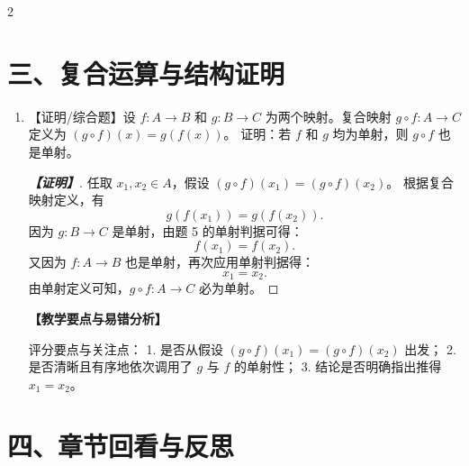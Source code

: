 \documentclass[12pt]{ctexart}
\newenvironment{solution}[1][解]{%
    \par\begingroup\color{blue!85!black}%
    \begin{proof}[\indent\bfseries\color{blue!85!black}【#1】]%
  }{%
    \end{proof}\endgroup\par
  }
\newenvironment{teacherNote}[1][教学要点与易错分析]{%
    \par\vspace{0.6ex}%
    \begingroup\color{teal!80!black}\small
    \noindent\textbf{【#1】}\par\vspace{0.2ex}%
  }{%
    \endgroup\par\vspace{0.6ex}%
  }
\newcommand{\ansspace}[1]{\par\vspace{0.4ex}}
\newcommand{\ansspace}[1]{\vspace{#1}}
\begin{document}
\begin{multicols}{2}
\section*{三、复合运算与结构证明}

\begin{enumerate}[resume=probchain]

\item 【证明/综合题】设 $f: A \to B$ 和 $g: B \to C$ 为两个映射。复合映射 $g \circ f: A \to C$ 定义为 $(g \circ f)(x) = g(f(x))$。
证明：若 $f$ 和 $g$ 均为单射，则 $g \circ f$ 也是单射。
\ansspace{5.5cm}
\begin{solution}[证明]
任取 $x_1, x_2 \in A$，假设 $(g \circ f)(x_1) = (g \circ f)(x_2)$。
根据复合映射定义，有
\[
  g(f(x_1)) = g(f(x_2)).
\]
因为 $g: B \to C$ 是单射，由题 5 的单射判据可得：
\[
  f(x_1) = f(x_2).
\]
又因为 $f: A \to B$ 也是单射，再次应用单射判据得：
\[
  x_1 = x_2.
\]
由单射定义可知，$g \circ f: A \to C$ 必为单射。
\end{solution}
\begin{teacherNote}
评分要点与关注点：
1. 是否从假设 $(g \circ f)(x_1) = (g \circ f)(x_2)$ 出发；
2. 是否清晰且有序地依次调用了 $g$ 与 $f$ 的单射性；
3. 结论是否明确指出推得 $x_1 = x_2$。
\end{teacherNote}

\end{enumerate}

\section*{四、章节回看与反思}

\begin{enumerate}[resume=probchain]


\end{enumerate}
\end{multicols}
\end{document}
